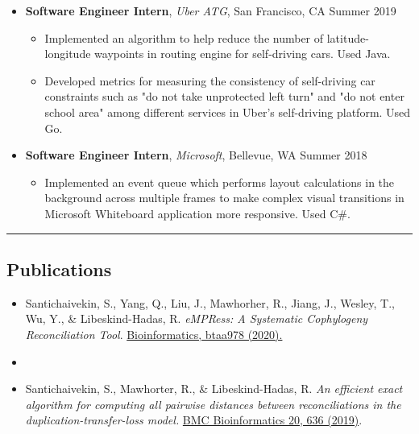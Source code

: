 \documentclass[10pt,letterpaper]{article}
\begin{document}
\begin{itemize}
\begin{itemize}[label=\textbullet]
    \end{itemize}
    \item[]
    {\textbf{Software Engineer Intern}, \textit{Uber ATG}, San Francisco, CA \hfill {Summer 2019}}
    \begin{itemize}[label=\textbullet]
      \itemsep0.1em
      \item Implemented an algorithm to help reduce the number of
      latitude-longitude waypoints in routing engine for self-driving cars. Used Java.
      \item Developed metrics for measuring the consistency of self-driving car constraints such as "do not take unprotected left turn" and "do not enter school area" among different services in Uber's self-driving platform. Used Go.
    \end{itemize}
    \item[]
    {\textbf{Software Engineer Intern}, \textit{Microsoft}, Bellevue, WA \hfill {Summer 2018}}
    \begin{itemize}[label=\textbullet]
      \itemsep0.1em
      \item Implemented an event queue which performs layout calculations in the background 
      across multiple frames to make complex visual transitions in Microsoft Whiteboard application
      more responsive. Used C\#.
    \end{itemize}
  \end{itemize}

\vspace{-0.25em}
\hrule
\vspace{-0.55em}
\subsection*{Publications}
\begin{itemize}[label={}]
  \parskip=-0.25em
  \item Santichaivekin, S., Yang, Q., Liu, J., Mawhorher, R., Jiang, J., Wesley, T., Wu, Y., \& Libeskind-Hadas, R. \textit{eMPRess: A Systematic Cophylogeny Reconciliation Tool}. \href{https://doi.org/10.1093/bioinformatics/btaa978}{Bioinformatics, btaa978 (2020).}
  \vspace{0.2em}
  \item[]\vspace{-1.3em}
  \item Santichaivekin, S., Mawhorter, R., \& Libeskind-Hadas, R. \textit{An efficient exact algorithm for computing all pairwise distances between reconciliations in the duplication-transfer-loss model.} \href{https://doi.org/10.1186/s12859-019-3203-9}{BMC Bioinformatics 20, 636 (2019)}.
\end{itemize}
\end{document}
